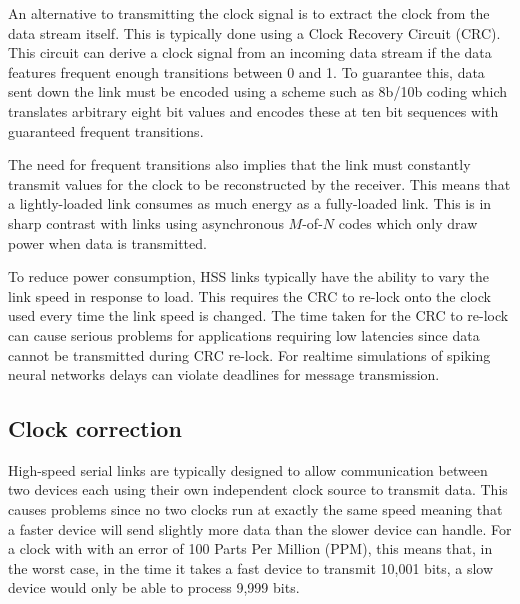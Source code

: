 			An alternative to transmitting the clock signal is to extract the clock
			from the data stream itself. This is typically done using a Clock Recovery
			Circuit (CRC). This circuit can derive a clock signal from an incoming
			data stream if the data features frequent enough transitions between 0 and
			1. To guarantee this, data sent down the link must be encoded using a
			scheme such as 8b/10b coding \cite{widmer83} which translates arbitrary
			eight bit values and encodes these at ten bit sequences with guaranteed
			frequent transitions.
			
			The need for frequent transitions also implies that the link must
			constantly transmit values for the clock to be reconstructed by the
			receiver. This means that a lightly-loaded link consumes as much energy as
			a fully-loaded link. This is in sharp contrast with links using
			asynchronous $M$-of-$N$ codes which only draw power when data is
			transmitted.
			
			To reduce power consumption, HSS links typically have the ability to vary
			the link speed in response to load.  This requires the CRC to re-lock onto
			the clock used every time the link speed is changed. The time taken for
			the CRC to re-lock can cause serious problems for applications requiring
			low latencies since data cannot be transmitted during CRC re-lock. For
			realtime simulations of spiking neural networks delays can violate
			deadlines for message transmission.
		
		\subsection{Clock correction}
			
			High-speed serial links are typically designed to allow communication
			between two devices each using their own independent clock source to
			transmit data. This causes problems since no two clocks run at exactly the
			same speed meaning that a faster device will send slightly more data than
			the slower device can handle. For a clock with with an error of 100 Parts
			Per Million (PPM), this means that, in the worst case, in the time it
			takes a fast device to transmit 10,001 bits, a slow device would only be
			able to process 9,999 bits.
			
